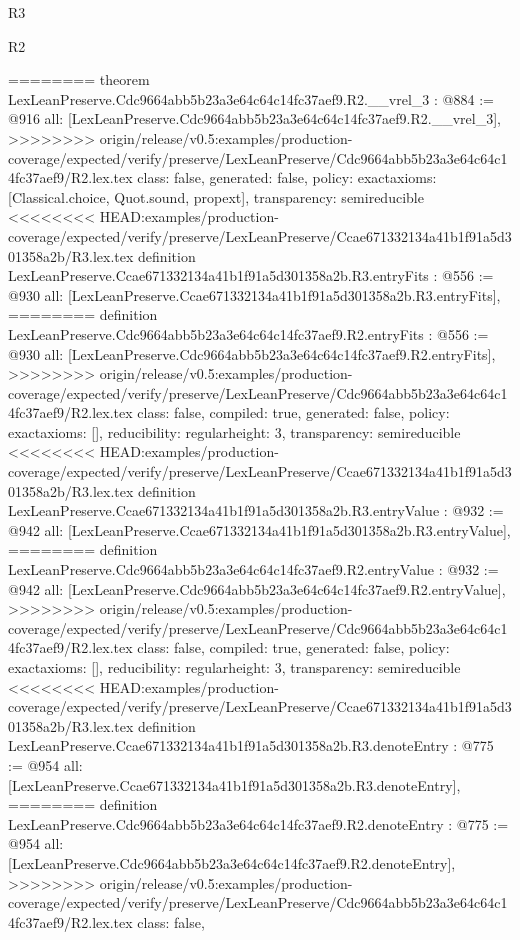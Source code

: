 \begin{lexlean}{R3}
\begin{lexlean}{R2}
\begin{coremodule}
{{{{{{{{{{{{{{{========
theorem LexLeanPreserve.Cdc9664abb5b23a3e64c64c14fc37aef9.R2.__vrel_3 : @884 := @916 {
  all: [LexLeanPreserve.Cdc9664abb5b23a3e64c64c14fc37aef9.R2.__vrel_3],
>>>>>>>> origin/release/v0.5:examples/production-coverage/expected/verify/preserve/LexLeanPreserve/Cdc9664abb5b23a3e64c64c14fc37aef9/R2.lex.tex
  class: false,
  generated: false,
  policy: exact{axioms: [Classical.choice, Quot.sound, propext]},
  transparency: semireducible
}
<<<<<<<< HEAD:examples/production-coverage/expected/verify/preserve/LexLeanPreserve/Ccae671332134a41b1f91a5d301358a2b/R3.lex.tex
definition LexLeanPreserve.Ccae671332134a41b1f91a5d301358a2b.R3.entryFits : @556 := @930 {
  all: [LexLeanPreserve.Ccae671332134a41b1f91a5d301358a2b.R3.entryFits],
========
definition LexLeanPreserve.Cdc9664abb5b23a3e64c64c14fc37aef9.R2.entryFits : @556 := @930 {
  all: [LexLeanPreserve.Cdc9664abb5b23a3e64c64c14fc37aef9.R2.entryFits],
>>>>>>>> origin/release/v0.5:examples/production-coverage/expected/verify/preserve/LexLeanPreserve/Cdc9664abb5b23a3e64c64c14fc37aef9/R2.lex.tex
  class: false,
  compiled: true,
  generated: false,
  policy: exact{axioms: []},
  reducibility: regular{height: 3},
  transparency: semireducible
}
<<<<<<<< HEAD:examples/production-coverage/expected/verify/preserve/LexLeanPreserve/Ccae671332134a41b1f91a5d301358a2b/R3.lex.tex
definition LexLeanPreserve.Ccae671332134a41b1f91a5d301358a2b.R3.entryValue : @932 := @942 {
  all: [LexLeanPreserve.Ccae671332134a41b1f91a5d301358a2b.R3.entryValue],
========
definition LexLeanPreserve.Cdc9664abb5b23a3e64c64c14fc37aef9.R2.entryValue : @932 := @942 {
  all: [LexLeanPreserve.Cdc9664abb5b23a3e64c64c14fc37aef9.R2.entryValue],
>>>>>>>> origin/release/v0.5:examples/production-coverage/expected/verify/preserve/LexLeanPreserve/Cdc9664abb5b23a3e64c64c14fc37aef9/R2.lex.tex
  class: false,
  compiled: true,
  generated: false,
  policy: exact{axioms: []},
  reducibility: regular{height: 3},
  transparency: semireducible
}
<<<<<<<< HEAD:examples/production-coverage/expected/verify/preserve/LexLeanPreserve/Ccae671332134a41b1f91a5d301358a2b/R3.lex.tex
definition LexLeanPreserve.Ccae671332134a41b1f91a5d301358a2b.R3.denoteEntry : @775 := @954 {
  all: [LexLeanPreserve.Ccae671332134a41b1f91a5d301358a2b.R3.denoteEntry],
========
definition LexLeanPreserve.Cdc9664abb5b23a3e64c64c14fc37aef9.R2.denoteEntry : @775 := @954 {
  all: [LexLeanPreserve.Cdc9664abb5b23a3e64c64c14fc37aef9.R2.denoteEntry],
>>>>>>>> origin/release/v0.5:examples/production-coverage/expected/verify/preserve/LexLeanPreserve/Cdc9664abb5b23a3e64c64c14fc37aef9/R2.lex.tex
  class: false,
}}}}}}}}}}}}}}}}}}}
\end{coremodule}
\end{lexlean}
\end{lexlean}
